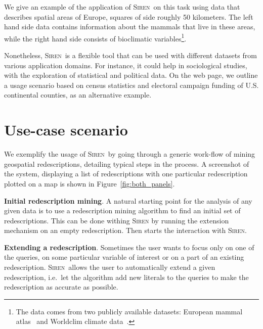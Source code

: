 \documentclass{llncs}
\newcommand{\prg}[1]{\textbf{#1}.}
\newcommand{\Siren}{\textsc{Siren}}
\begin{document}
We give an example of the application of \Siren\ on this task using data
that describes spatial areas of Europe, squares of side roughly 50
kilometers.  The left hand side data contains information about the
mammals that live in these areas, while the right hand side consists
of bioclimatic variables\footnote{The data comes from two publicly available
datasets: European mammal atlas~\cite{mitchell-jones99atlas} and
Worldclim climate data~\cite{hijmans05very}.}.


Nonetheless, \Siren\ is a flexible tool that can be used with
different datasets from various application domains. For instance, it
could help in sociological studies, with the exploration of
statistical and political data. On the web page, we outline a usage scenario based on census
statistics and electoral campaign funding of U.S. continental counties, as an alternative example.



\section{Use-case scenario}
\label{sec:scenarios}
We exemplify the usage of \Siren\ by going through a generic work-flow of
mining geospatial redescriptions, detailing typical steps in the process.  A screenshot of the system,
displaying a list of redescriptions with one
particular redescription plotted on a map is shown in
Figure~\ref{fig:both_panels}.

\prg{Initial redescription mining} A natural starting point for the
analysis of any given data is to use a redescription mining algorithm
to find an initial set of redescriptions.
This can be done withing \Siren{} by running the extension mechanism on an empty redescription.
Then starts the interaction with \Siren.

 
\prg{Extending a redescription} Sometimes the user wants to focus only
on one of the queries, on some particular variable of interest or on a
part of an existing redescription.  \Siren\ allows the user to
automatically extend a given redescription, i.e.\ let the algorithm
add new literals to the queries to make the redescription as accurate
as possible.
\end{document}
